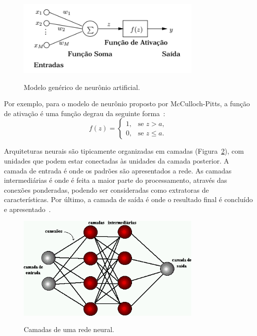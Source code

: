 \begin{figure}[!hbtp]
  \centering
   \caption{Modelo genérico de neurônio artificial.}
    \includegraphics[width = 0.8\textwidth]{Caps/Figs/ref-teorico/mccul.png}
   \label{fig:neuronioartificial}
\end{figure}

Por exemplo, para o modelo de neurônio proposto por McCulloch-Pitts, a função de ativação é uma função degrau da seguinte forma~\cite{magalhaes2004redes}:
\begin{equation}
    f(z) = \left\{\begin{matrix}
    1, & \mbox{se } z > a, \\ 
    0, & \mbox{se } z \leq a.
    \end{matrix}\right.
\end{equation}

Arquiteturas neurais são tipicamente organizadas em camadas (Figura~\ref{fig:redeneuralCamadas}), com unidades que podem estar conectadas às unidades da camada posterior. A camada de entrada é onde os padrões são apresentados a rede. As camadas intermediárias é onde é feita a maior parte do processamento, através das conexões ponderadas, podendo ser consideradas como extratoras de características. Por último, a camada de saída é onde o resultado final é concluído e apresentado~\cite{andreCarvalhoRNA}.

\begin{figure}[!hbtp]
  \centering
   \caption{Camadas de uma rede neural.}
    \includegraphics[width = 0.8\textwidth]{Caps/Figs/ref-teorico/rede-neural-camadas.jpg}
   \label{fig:redeneuralCamadas}
\end{figure}

